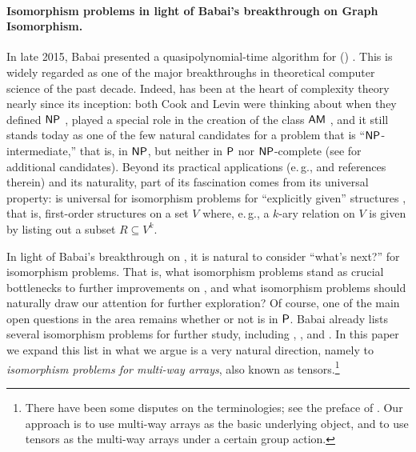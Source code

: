 
\newcommand{\Sec}[1]{Sec.~\ref{#1}}
\newcommand{\Thm}[1]{Thm.~\ref{#1}}
\newcommand{\Obs}[1]{Obs.~\ref{#1}}
\newcommand{\Prop}[1]{Prop.~\ref{#1}}
\newcommand{\Cor}[1]{Cor.~\ref{#1}}
\newcommand{\Lem}[1]{Lem.~\ref{#1}}

\paragraph{Isomorphism problems in light of Babai's breakthrough on Graph 
Isomorphism.}
In late 2015, Babai presented a quasipolynomial-time algorithm for  
\GIlong (\GI) \cite{Bab16}. This is widely regarded as one of the major 
breakthroughs in 
theoretical computer science of the past decade. Indeed, \GI
 has been at the heart of complexity theory 
nearly since its inception: both Cook and Levin were thinking about \GI when they 
defined $\mathsf{NP}$ \cite[Sec. 1]{AllenderDas},  
played a special role in the creation of the 
class $\mathsf{AM}$ \cite{babai85, GMR85, BM88}, 
and it still stands today 
as one of the few 
natural candidates for a problem that 
is ``$\mathsf{NP}$-intermediate,'' that is, in $\mathsf{NP}$, but neither in $\mathsf{P}$ nor 
$\mathsf{NP}$-complete \cite{Ladner} (see \cite{StackExchangeIntermediate} for 
additional 
candidates). Beyond its practical applications (e.\,g., \cite{SV17, irniger} and references therein) and its 
naturality, part of its fascination comes from its universal property: \GI is 
universal for isomorphism problems for ``explicitly given'' structures \cite[Sec.~15]{ZKT}, that is, first-order structures on a set $V$ 
where, e.\,g., a $k$-ary relation on $V$ is given by listing out a subset $R 
\subseteq V^k$. 

In light of Babai's breakthrough
on \GI \cite{Bab16}, it is natural to consider ``what's next?'' 
for isomorphism problems. That is, what isomorphism problems stand as crucial 
bottlenecks to further improvements on \GI, and what isomorphism problems should 
naturally draw our attention for further exploration? Of course, 
one of the main open questions in the area remains whether or not \GI is in $\mathsf{P}$.
Babai \cite[arXiv version, Sec.~13.2 and 13.4]{Bab16} already lists several 
isomorphism problems for further study, including \GpIlong, 
, and . In 
this paper we expand this list in what we argue is a very natural direction, 
namely to \emph{isomorphism problems for multi-way arrays}, also known as 
tensors.\footnote{There have been some disputes on the terminologies; see the 
preface of \cite{Lan12}. Our approach is to use 
multi-way arrays as the basic 
underlying object, and to use tensors as the multi-way arrays under a certain group 
action.}


